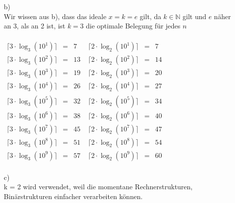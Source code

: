 \documentclass[a4paper,11pt,fleqn]{scrartcl}
\begin{document}
\begin{enumerate}
\begin{enumerate}
\begin{array}{rcl}
					&=&  -  \\
					&=&  \\
				\end{array} 
				\)
				Man sieht, dass einer der Faktoren im Zähler 0 sein muss, damit \(\frac{\ln(n)(\ln(x)-1)}{\ln(x)^2} = 0\)
				gilt. Da n beliebig, aber fest ist, ist die Frage, für welches x dies gilt. Wenn $x = e$ gilt, dann 
				folgt \(\frac{\ln(n)(\ln(e)-1)}{\ln(e)^2} = \frac{0}{1}\)
			\item[b)]\quad \\
				Wir wissen aus b), dass das ideale $x = k = e$ gilt, da $k\in\mathbb{N}$ gilt und $e$ näher an 3, als an 2 ist,
				ist $k=3$ die optimale Belegung für jedes $n$ \\ \\
				\(
				\begin{array}{rcl}
					\lceil 3 \cdot\log_3(10^1)\rceil &=& 7 \\
					\lceil 3 \cdot\log_3(10^2)\rceil &=& 13 \\
					\lceil 3 \cdot\log_3(10^3)\rceil &=& 19 \\
					\lceil 3 \cdot\log_3(10^4)\rceil &=& 26 \\
					\lceil 3 \cdot\log_3(10^5)\rceil &=& 32 \\
					\lceil 3 \cdot\log_3(10^6)\rceil &=& 38 \\
					\lceil 3 \cdot\log_3(10^7)\rceil &=& 45 \\
					\lceil 3 \cdot\log_3(10^8)\rceil &=& 51 \\
					\lceil 3 \cdot\log_3(10^9)\rceil &=& 57 \\
				\end{array}
				\) \quad \quad
				\(
				\begin{array}{rcl}
					\lceil 2 \cdot\log_2(10^1)\rceil &=& 7 \\
					\lceil 2 \cdot\log_2(10^2)\rceil &=& 14 \\
					\lceil 2 \cdot\log_2(10^3)\rceil &=& 20 \\
					\lceil 2 \cdot\log_2(10^4)\rceil &=& 27 \\
					\lceil 2 \cdot\log_2(10^5)\rceil &=& 34 \\
					\lceil 2 \cdot\log_2(10^6)\rceil &=& 40 \\
					\lceil 2 \cdot\log_2(10^7)\rceil &=& 47 \\
					\lceil 2 \cdot\log_2(10^8)\rceil &=& 54 \\
					\lceil 2 \cdot\log_2(10^9)\rceil &=& 60 \\
				\end{array}
				\)
			\item[c)]\quad \\
				k = 2 wird verwendet, weil die momentane Rechnerstrukturen, Binärstrukturen einfacher verarbeiten können.
				

\end{enumerate}
\end{enumerate}
\end{document}
